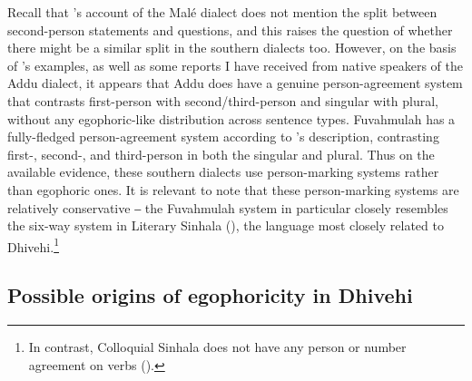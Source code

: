 \documentclass[output=paper]{langsci/langscibook}
\begin{document}
Recall that \citeauthor{Fritz2002}’s account of the Malé dialect does not mention the split between second-person statements and questions, and this raises the question of whether there might be a similar split in the southern dialects too. However, on the basis of \citeauthor{Fritz2002}’s examples, as well as some reports I have received from native speakers of the Addu dialect, it appears that Addu does have a genuine person-agreement system that contrasts first-person with second/third-person and singular with plural, without any egophoric-like distribution across sentence types. Fuvahmulah has a fully-fledged person-agreement system according to \citeauthor{Fritz2002}’s description, contrasting first-, second-, and third-person in both the singular and plural. Thus on the available evidence, these southern dialects use person-marking systems rather than egophoric ones. It is relevant to note that these person-marking systems are relatively conservative ‒ the Fuvahmulah system in particular closely resembles the six-way system in Literary Sinhala (\citealt[168–175]{Fritz2002}), the language most closely related to Dhivehi.\footnote{ In contrast, Colloquial Sinhala does not have any person or number agreement on verbs (\citealt[15]{Gair1990}).}

\subsection{Possible origins of egophoricity in Dhivehi}\label{s:jl4-3}
\end{document}
